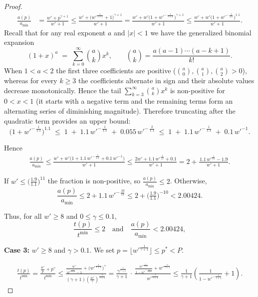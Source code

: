 \documentclass{article}
\begin{document}
\begin{proof}
\begin{align*}
\frac{a(p)}{a_{\min}} &= \frac{w'+p^{\gamma+1}}{w'+1}\le \frac{w'+\bigl(w'^{\frac{1}{\gamma+1}}+1\bigr)^{\gamma+1}}{w'+1}=   \frac{w'+w'\!\bigl(1+w'^{-\,\frac{1}{\gamma+1}}\bigr)^{\gamma+1}}{w'+1} \le \frac{w'+w'\!\bigl(1+w'^{-\,\frac{1}{1.1}}\bigr)^{1.1}}{w'+1}.
\end{align*}
Recall that for any real exponent $a$ and $|x|<1$ we have the generalized
binomial expansion
\[
(1+x)^a \;=\; \sum_{k=0}^{\infty} \binom{a}{k} x^{k},
\qquad
\binom{a}{k} = \frac{a(a-1)\cdots(a-k+1)}{k!}.
\]
When $1 < a < 2$ the first three coefficients are positive
($\binom{a}{0},\binom{a}{1},\binom{a}{2} > 0$),
whereas for every $k\ge 3$ the coefficients alternate in sign
and their absolute values decrease monotonically.
Hence the tail
\(
\sum_{k=3}^{\infty} \binom{a}{k} x^{k}
\)
is non-positive for $0 < x < 1$ (it starts with a negative term and the
remaining terms form an alternating series of diminishing magnitude).
Therefore truncating after the quadratic term provides an upper bound:
\[
\bigl(1+w'^{-\,\tfrac{1}{1.1}}\bigr)^{1.1}
   \;\le\;
   1 \;+\; 1.1\,w'^{-\,\tfrac{1}{1.1}}
   \;+\; 0.055\,w'^{-\,\tfrac{2}{1.1}}
   \;\le\;
   1 \;+\; 1.1\,w'^{-\,\tfrac{1}{1.1}}
   \;+\; 0.1\,w'^{-1}.
\]


Hence
\begin{align*}
\frac{a(p)}{a_{\min}} \le \frac{w'+w'\bigl(1+1.1\,w'^{-\,\frac{1}{1.1}}+0.1\,w'^{-1}\bigr)}{w'+1} \le \frac{2w'+1.1\,w'^{\frac{1}{11}}+0.1}{w'+1} =   2+\frac{\,1.1\,w'^{\frac{1}{11}}-1.9}{w'+1}.
\end{align*}

If \(w'\le \bigl(\tfrac{1.9}{1.1}\bigr)^{11}\) the fraction is non-positive,
so \(\frac{a(p)}{a_{\min}}\le 2\).
Otherwise,
\[
\frac{a(p)}{a_{\min}}
    \le 2+1.1\,w'^{-\,\frac{10}{11}}
    \le 2+\bigl(\tfrac{1.9}{1.1}\bigr)^{-10}
    < 2.00424.
\]

Thus, for all \(w'\ge 8\) and \(0\le\gamma\le0.1\),
\[
\frac{t(p)}{t^{\min}}\le 2
\quad\text{and}\quad
\frac{a(p)}{a_{\min}}<2.00424,
\]

\textbf{Case 3:}  $w' \ge 8$ and $\gamma > 0.1$.  
We set \(p=\bigl\lfloor w'^{\frac{1}{\gamma+1}}\bigr\rfloor \leq p^* <P \).

\begin{align*}
\frac{t(p)}{t^{\min}} = \frac{\tfrac{w'}{p}+p^\gamma}{t^{\min}} \le \frac{\displaystyle
              \frac{w'}{\,w'^{\frac{1}{\gamma+1}}-1}
              +\bigl(w'^{\frac{1}{\gamma+1}}\bigr)^{\gamma}}
            {(\gamma+1)\!\left(\frac{w'}{\gamma}\right)^{\frac{\gamma}{\gamma+1}}}= \frac{\gamma^{\frac{\gamma}{\gamma+1}}}{\gamma+1}
      \,\cdot\,
      \frac{\displaystyle
            \tfrac{w'^{\frac{\gamma}{\gamma+1}}}{1-w'^{-\frac{1}{\gamma+1}}}
            +w'^{\frac{\gamma}{\gamma+1}}}
           {w'^{\frac{\gamma}{\gamma+1}}} \le \frac{1}{\gamma+1}\!
      \left(\frac{1}{1-w'^{-\frac{1}{\gamma+1}}}+1\right).
\end{align*}


\end{proof}
\end{document}
